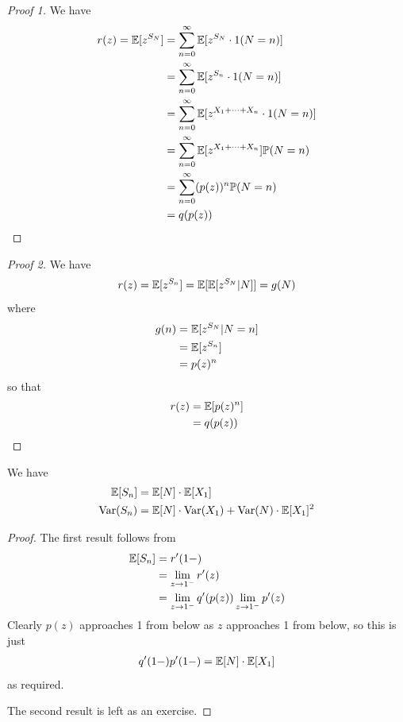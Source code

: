 \documentclass{../template/note}
\begin{document}
    \begin{proof}[Proof 1]
        We have
        \begin{align*}
            r(z) = \mathbb E[z^{S_N}] &= \sum_{n=0}^\infty \mathbb E[z^{S_N} \cdot 1(N = n)] \\
            &= \sum_{n=0}^\infty \mathbb E[z^{S_n} \cdot 1(N = n)] \\
            &= \sum_{n=0}^\infty \mathbb E[z^{X_1+\dots+X_n} \cdot 1(N = n)] \\
            &= \sum_{n=0}^\infty \mathbb E[z^{X_1+\dots+X_n}] \mathbb P(N = n) \\
            &= \sum_{n=0}^\infty (p(z))^n \mathbb P(N = n) \\
            &= q(p(z))
        \end{align*}
    \end{proof}
    
    \begin{proof}[Proof 2]
        We have
        \begin{align*}
            r(z) = \mathbb E[z^{S_n}] = \mathbb E[\mathbb E[z^{S_N} | N]] = g(N)
        \end{align*}
        where
        \begin{align*}
            g(n) &= \mathbb E[z^{S_N} | N = n] \\
            &= \mathbb E[z^{S_n}] \\
            &= p(z)^n
        \end{align*}
        so that
        \begin{align*}
            r(z) &= \mathbb E[p(z)^n] \\
            &= q(p(z))
        \end{align*}
    \end{proof}
    
    \begin{corollary}
        We have
        \begin{align*}
            \mathbb E[S_n] &= \mathbb E[N] \cdot \mathbb E[X_1] \\
            \operatorname{Var}(S_n) &= \mathbb E[N] \cdot \operatorname{Var}(X_1)+ \operatorname{Var}(N) \cdot \mathbb E[X_1]^2
        \end{align*}
    \end{corollary}
    
    \begin{proof}
        The first result follows from
        \begin{align*}
            \mathbb E[S_n] &= r'(1-) \\
            &= \lim_{z\to 1^-} r'(z) \\
            &= \lim_{z\to 1^-} q'(p(z)) \lim_{z\to 1^-} p'(z) 
        \end{align*}
        Clearly \(p(z)\) approaches 1 from below as \(z\) approaches 1 from below, so this is just
        \begin{align*}
            q'(1-)p'(1-) = \mathbb E[N] \cdot \mathbb E[X_1]
        \end{align*}
        as required.   
        
        The second result is left as an exercise.
    \end{proof}
    
\end{document}
